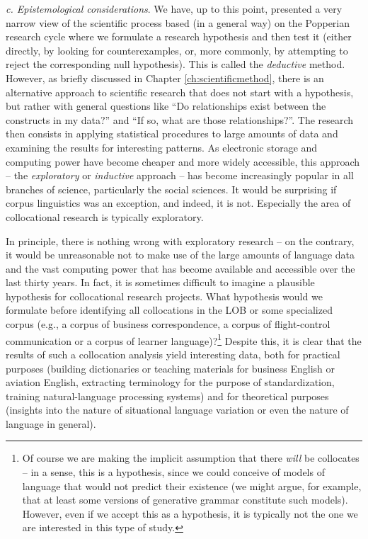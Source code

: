 \textit{c. Epistemological considerations}. We have, up to this point, presented a very narrow view of the scientific process based (in a general way) on the Popperian research cycle where we formulate a research hypothesis and then test it (either directly, by looking for counterexamples, or, more commonly, by attempting to reject the corresponding null hypothesis). This is called the \textit{deductive} method. However, as briefly discussed in Chapter \ref{ch:scientificmethod}, there is an alternative approach to scientific research that does not start with a hypothesis, but rather with general questions like ``Do relationships exist between the constructs in my data?'' and ``If so, what are those relationships?''. The research then consists in applying statistical procedures to large amounts of data and examining the results for interesting patterns. As electronic storage and computing power have become cheaper and more widely accessible, this approach -- the \textit{exploratory} or \textit{inductive} approach -- has become increasingly popular in all branches of science, particularly the social sciences. It would be surprising if corpus linguistics was an exception, and indeed, it is not. Especially the area of collocational research is typically exploratory.

In principle, there is nothing wrong with exploratory research -- on the contrary, it would be unreasonable not to make use of the large amounts of language data and the vast computing power that has become available and accessible over the last thirty years. In fact, it is sometimes difficult to imagine a plausible hypothesis for collocational research projects. What hypothesis would we formulate before identifying all collocations in the LOB or some specialized corpus (e.g., a corpus of business correspondence, a corpus of flight-control communication or a corpus of learner language)?\footnote{Of course we are making the implicit assumption that there \textit{will} be collocates -- in a sense, this is a hypothesis, since we could conceive of models of language that would not predict their existence (we might argue, for example, that at least some versions of generative grammar constitute such models). However, even if we accept this as a hypothesis, it is typically not the one we are interested in this type of study.} Despite this, it is clear that the results of such a collocation analysis yield interesting data, both for practical purposes (building dictionaries or teaching materials for business English or aviation English, extracting terminology for the purpose of standardization, training natural-language processing systems) and for theoretical purposes (insights into the nature of situational language variation or even the nature of language in general).

